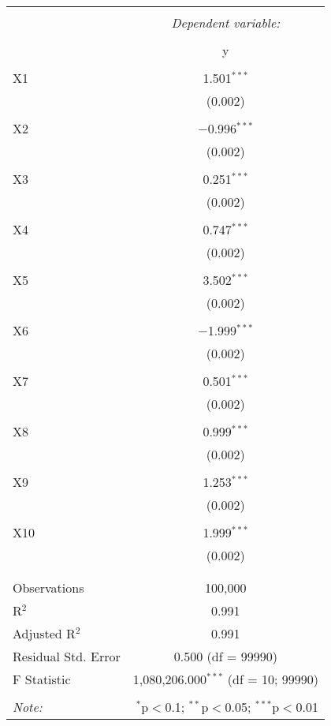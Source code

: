 \documentclass{article}
\begin{document}
\begin{table}[!htbp] \centering
  \caption{}
  \label{}
\begin{tabular}{@{\extracolsep{5pt}}lc}
\\[-1.8ex]\hline
\hline \\[-1.8ex]
 & \multicolumn{1}{c}{\textit{Dependent variable:}} \\
\cline{2-2}
\\[-1.8ex] & y \\
\hline \\[-1.8ex]
 X1 & 1.501$^{***}$ \\
  & (0.002) \\
  & \\
 X2 & $-$0.996$^{***}$ \\
  & (0.002) \\
  & \\
 X3 & 0.251$^{***}$ \\
  & (0.002) \\
  & \\
 X4 & 0.747$^{***}$ \\
  & (0.002) \\
  & \\
 X5 & 3.502$^{***}$ \\
  & (0.002) \\
  & \\
 X6 & $-$1.999$^{***}$ \\
  & (0.002) \\
  & \\
 X7 & 0.501$^{***}$ \\
  & (0.002) \\
  & \\
 X8 & 0.999$^{***}$ \\
  & (0.002) \\
  & \\
 X9 & 1.253$^{***}$ \\
  & (0.002) \\
  & \\
 X10 & 1.999$^{***}$ \\
  & (0.002) \\
  & \\
\hline \\[-1.8ex]
Observations & 100,000 \\
R$^{2}$ & 0.991 \\
Adjusted R$^{2}$ & 0.991 \\
Residual Std. Error & 0.500 (df = 99990) \\
F Statistic & 1,080,206.000$^{***}$ (df = 10; 99990) \\
\hline
\hline \\[-1.8ex]
\textit{Note:}  & \multicolumn{1}{r}{$^{*}$p$<$0.1; $^{**}$p$<$0.05; $^{***}$p$<$0.01} \\
\end{tabular}
\end{table}
\end{document}
